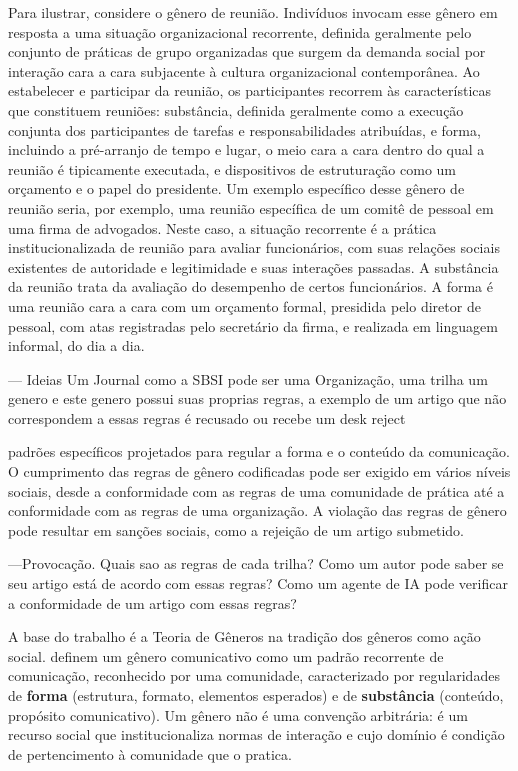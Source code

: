 Para ilustrar, considere o gênero de reunião. Indivíduos invocam esse gênero
em resposta a uma situação organizacional recorrente, definida geralmente pelo
conjunto de práticas de grupo organizadas que surgem da demanda social por
interação cara a cara subjacente à cultura organizacional contemporânea. Ao
estabelecer e participar da reunião, os participantes recorrem às características
que constituem reuniões: substância, definida geralmente como a execução
conjunta dos participantes de tarefas e responsabilidades atribuídas, e forma,
incluindo a pré-arranjo de tempo e lugar, o meio cara a cara dentro do qual a
reunião é tipicamente executada, e dispositivos de estruturação como um
orçamento e o papel do presidente. Um exemplo específico desse gênero de
reunião seria, por exemplo, uma reunião específica de um comitê de pessoal em
uma firma de advogados. Neste caso, a situação recorrente é a prática
institucionalizada de reunião para avaliar funcionários, com suas relações sociais
existentes de autoridade e legitimidade e suas interações passadas. A substância
da reunião trata da avaliação do desempenho de certos funcionários. A forma é
uma reunião cara a cara com um orçamento formal, presidida pelo diretor de
pessoal, com atas registradas pelo secretário da firma, e realizada em linguagem
informal, do dia a dia.

--- Ideias
Um Journal como a SBSI pode ser uma Organização, uma trilha um genero e este genero possui suas proprias regras, a exemplo de um artigo que não correspondem a essas regras é recusado ou recebe um desk reject


padrões específicos projetados para regular a forma e o conteúdo da comunicação. O
cumprimento das regras de gênero codificadas pode ser exigido em vários níveis sociais, desde a conformidade com as regras de uma comunidade de prática até a conformidade com as regras de uma organização. A violação das regras de gênero pode resultar em sanções sociais, como a rejeição de um artigo submetido. 


---Provocação.
Quais sao as regras de cada trilha? Como um autor pode saber se seu artigo está de acordo com essas regras? Como um agente de IA pode verificar a conformidade de um artigo com essas regras? 


A base do trabalho é a Teoria de Gêneros na tradição dos gêneros como ação social. \cite{GenresOrgComm} definem um gênero comunicativo como um padrão recorrente de comunicação, reconhecido por uma comunidade, caracterizado por regularidades de \textbf{forma} (estrutura, formato, elementos esperados) e de \textbf{substância} (conteúdo, propósito comunicativo). Um gênero não é uma convenção arbitrária: é um recurso social que institucionaliza normas de interação e cujo domínio é condição de pertencimento à comunidade que o pratica.

